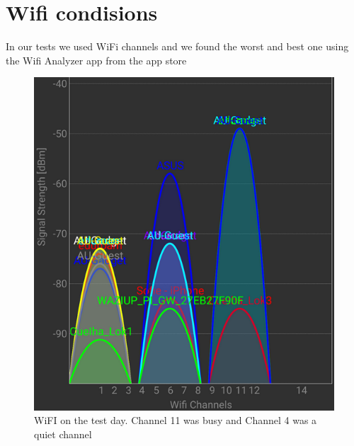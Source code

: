 \section{Wifi condisions}\label{sc:wifi}
In our tests we used WiFi channels and we found the worst and best one using the 
Wifi Analyzer app from the app store

\begin{figure}[H]
	\centering
	\includegraphics[width=1\linewidth]{testAndPerformance/wifi/wifiOnTheTestDay}
	\caption{WiFI on the test day. Channel 11 was busy and Channel 4 was a quiet channel}
	\label{fig:wifionthetestday}
\end{figure}
